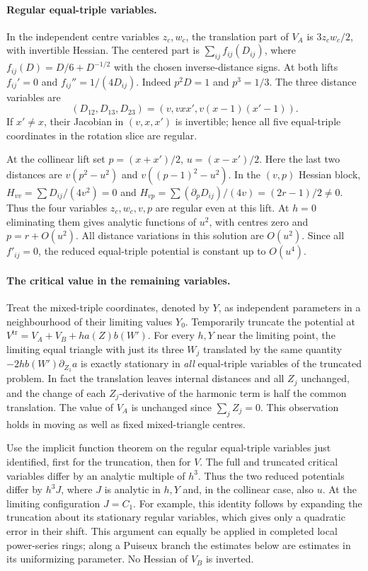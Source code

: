\documentclass[11pt,letterpaper]{article}
\theoremstyle{definition}
\begin{document}
\paragraph{Regular equal-triple variables.}
In the independent centre variables \(z_c,w_c\), the translation part
of \(V_A\) is \(3z_cw_c/2\), with invertible Hessian. The centered
part is \(\sum_{ij} f_{ij}(D_{ij})\), where
\(f_{ij}(D)=D/6+D^{-1/2}\) with the chosen inverse-distance signs.
At both lifts \(f_{ij}'=0\) and \(f_{ij}''=1/(4D_{ij})\).
Indeed \(p^2D=1\) and \(p^3=1/3\).
The three distance variables are
\[
  (D_{12},D_{13},D_{23})=(v,vxx',v(x-1)(x'-1)).
\]
If \(x'\ne x\), their Jacobian in \((v,x,x')\) is invertible; hence
all five equal-triple coordinates in the rotation slice are regular.

At the collinear lift set \(p=(x+x')/2\), \(u=(x-x')/2\).
Here the last two distances are \(v(p^2-u^2)\) and
\(v((p-1)^2-u^2)\). In the \((v,p)\) Hessian block,
\(H_{vv}=\sum D_{ij}/(4v^2)=0\) and
\(H_{vp}=\sum(\partial_pD_{ij})/(4v)=(2r-1)/2\ne0\).
Thus the four variables \(z_c,w_c,v,p\) are regular even at this lift.
At \(h=0\) eliminating them gives analytic functions of \(u^2\), with
centres zero and \(p=r+O(u^2)\). All distance variations in this
solution are \(O(u^2)\). Since all \(f'_{ij}=0\), the reduced
equal-triple potential is constant up to \(O(u^4)\).

\paragraph{The critical value in the remaining variables.}
Treat the mixed-triple coordinates, denoted by \(Y\), as independent
parameters in a neighbourhood of their limiting values \(Y_0\).
Temporarily truncate the potential at
\(V^{\mathrm{tr}}=V_A+V_B+h a(Z)b(W')\). For every \(h,Y\) near
the limiting point, the limiting equal triangle with just its three
\(W_j\) translated by the same quantity
\(-2h b(W')\partial_{Z_1}a\) is exactly stationary in \emph{all}
equal-triple variables of the truncated problem. In fact the
translation leaves internal distances and all \(Z_j\) unchanged,
and the change of each \(Z_j\)-derivative of the harmonic term is half
the common translation. The value of \(V_A\) is unchanged since
\(\sum_j Z_j=0\). This observation holds in moving as well as fixed
mixed-triangle centres.

Use the implicit function theorem on the regular equal-triple variables
just identified, first for the truncation, then for \(V\). The full and
truncated critical variables differ by an analytic multiple of \(h^3\).
Thus the two reduced potentials differ by \(h^3 J\), where \(J\)
is analytic in \(h,Y\) and, in the collinear case, also \(u\).
At the limiting configuration \(J=C_1\). For example, this identity
follows by expanding the truncation about its stationary regular
variables, which gives only a quadratic error in their shift. This
argument can equally be applied in completed local power-series rings;
along a Puiseux branch the estimates below are estimates in its
uniformizing parameter. No Hessian of \(V_B\) is inverted.
\end{document}
